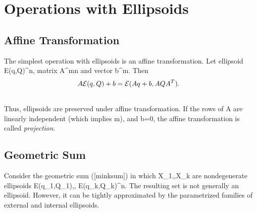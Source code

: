 \documentclass[letterpaper,10pt,english]{sphinxmanual}
\begin{document}
\section{Operations with Ellipsoids}
\label{chap_ellcalc:operations-with-ellipsoids}

\subsection{Affine Transformation}
\label{chap_ellcalc:affine-transformation}
The simplest operation with ellipsoids is an affine transformation. Let
ellipsoid {\mathcal E}(q,Q)^n, matrix
A^{m\times n} and vector b^m. Then
\begin{gather}
\begin{split}A{\mathcal E}(q,Q) + b = {\mathcal E}(Aq+b, AQA^T) .\label{affinetrans}\end{split}\notag\\\begin{split}\end{split}\notag
\end{gather}
Thus, ellipsoids are preserved under affine transformation. If the rows
of A are linearly independent (which implies
m\leqslantn), and b=0, the affine transformation is
called \emph{projection}.


\subsection{Geometric Sum}
\label{chap_ellcalc:geometric-sum}
Consider the geometric sum ({[}minksum{]}) in which
{\mathcal X}_1,\cdots,{\mathcal X}_k are nondegenerate
ellipsoids {\mathcal E}(q_1,Q_1),\cdots,
{\mathcal E}(q_k,Q_k)^n. The resulting set is
not generally an ellipsoid. However, it can be tightly approximated by
the parametrized families of external and internal ellipsoids.
\end{document}
